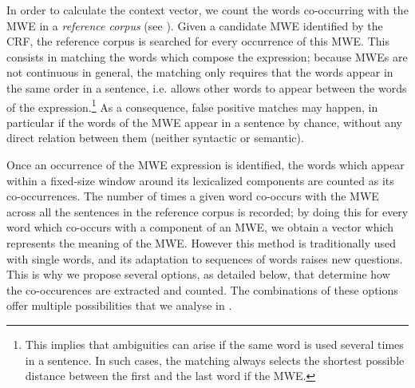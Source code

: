 \documentclass[output=paper
,modfonts
,nonflat]{langsci/langscibook}
\begin{document}
In order to calculate the context vector, we count the words
co-occurring with the MWE in a {\em reference corpus} (see
). Given a candidate MWE identified by the CRF,
the reference corpus is searched for every occurrence of this
MWE. This consists in matching the words which compose the expression;
because MWEs are not continuous in general, the matching only requires
that the words appear in the same order in a sentence, i.e. allows
other words to appear between the words of the
expression.\footnote{This implies that ambiguities can arise if the
  same word is used several times in a sentence. In such cases, the
  matching always selects the shortest possible distance between the
  first and the last word if the MWE.}  As a consequence, false
positive matches may happen, in particular if the words of the MWE
appear in a sentence by chance, without any direct relation between
them (neither syntactic or semantic).

Once an occurrence of the MWE expression is identified, the words
which appear within a fixed-size window around its lexicalized
components are counted as its co-occurrences. The number of times a
given word co-occurs with the MWE across all the sentences in the
reference corpus is recorded; by doing this for every word which
co-occurs with a component of an MWE, we obtain a vector which
represents the meaning of the MWE. However this
method is traditionally used with single words, and its adaptation to
sequences of words raises new questions. This is why we propose
several options, as detailed below, that determine how the
co-occurences are extracted and counted. The combinations of these
options offer multiple possibilities that we analyse in
.
\end{document}
